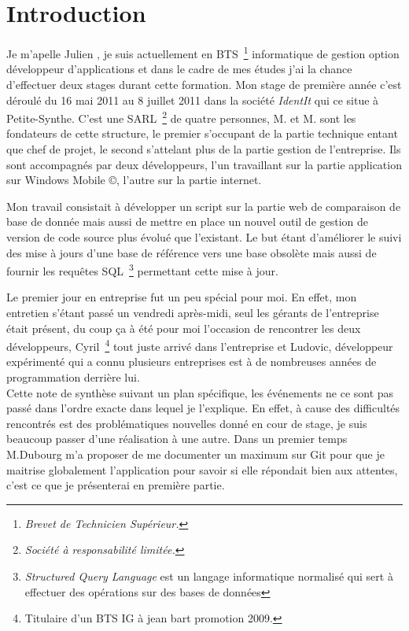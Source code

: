 \chapter{Introduction}

Je m'apelle Julien , je suis actuellement en BTS\,
\footnote{\emph{Brevet de Technicien Supérieur.}} informatique de gestion option
développeur d'applications et dans le cadre de mes études j'ai la chance
d'effectuer deux stages durant cette formation. Mon stage de première année
c'est déroulé du 16 mai 2011 au 8 juillet 2011 dans la société \emph{IdentIt}
qui ce situe à Petite-Synthe. C'est une SARL\, \footnote{\emph{Société à
responsabilité limitée.}} de quatre personnes, M. et M.
sont les fondateurs de cette structure, le premier s'occupant de la partie
technique entant que chef de projet, le second s'attelant plus de la partie
gestion de l'entreprise. Ils sont accompagnés par deux développeurs, l'un
travaillant sur la partie application sur Windows Mobile \copyright, l'autre
sur la partie internet.

Mon travail consistait à développer un script sur la partie web de comparaison
de base de donnée mais aussi de mettre en place un nouvel outil de gestion de
version de code source plus évolué que l'existant. Le but étant d'améliorer le
suivi des mise à jours d'une base de référence vers une base obsolète mais
aussi de fournir les requêtes SQL\, \footnote{\emph{Structured Query Language}
est un langage informatique normalisé qui sert à effectuer des opérations sur
des bases de données} permettant cette mise à jour.

Le premier jour en entreprise fut un peu spécial pour moi. En effet, mon
entretien s'étant passé un vendredi après-midi, seul les gérants de
l'entreprise était présent, du coup ça à été pour moi l'occasion de rencontrer
les deux développeurs, Cyril\, \footnote{Titulaire d'un BTS IG à jean bart
promotion 2009.} tout juste arrivé dans l'entreprise et Ludovic, développeur
expérimenté qui a connu plusieurs entreprises est à de nombreuses années de
programmation derrière lui.\\ Cette note de synthèse suivant un plan
spécifique, les événements ne ce sont pas passé dans l'ordre exacte dans lequel
je l'explique. En effet, à cause des difficultés rencontrés est des
problématiques nouvelles donné en cour de stage, je suis beaucoup passer d'une
réalisation à une autre.  Dans un premier temps M.Dubourg m'a proposer de me
documenter un maximum sur Git pour que je maitrise globalement l'application
pour savoir si elle répondait bien aux attentes, c'est ce que je présenterai en
première partie.

\clearpage
